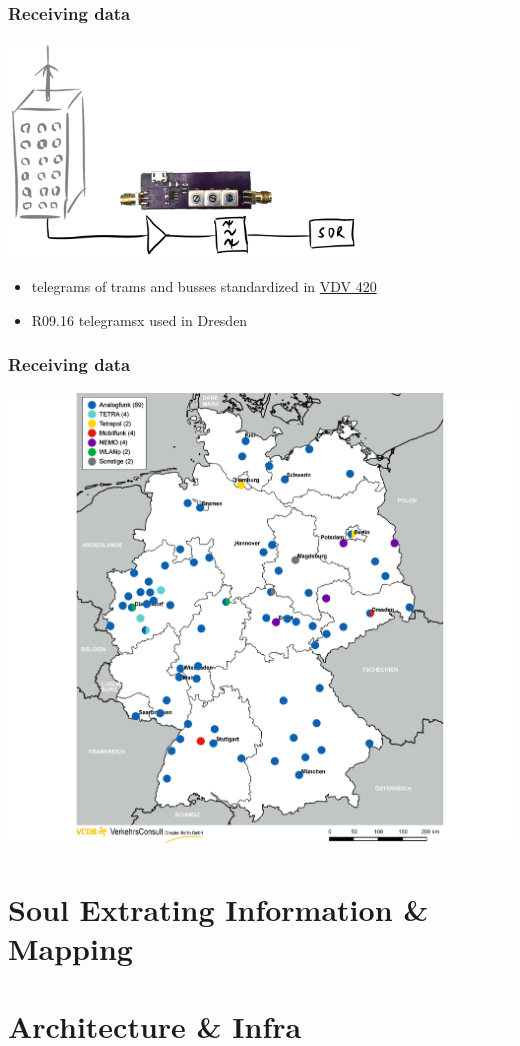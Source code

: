 \documentclass[aspectratio=169]{beamer}
\begin{document}
\begin{frame}
\frametitle{Receiving data}
\centering
\includegraphics[width=0.7\textwidth]{figs/antenna-filter.pdf}
\end{frame}

\begin{frame}
	\begin{itemize}
	\item telegrams of trams and busses standardized in \href{https://knowhow.vdv.de/documents/420/}{VDV 420}
	\item R09.16 telegramsx used in Dresden
	\end{itemize}
\end{frame}

\begin{frame}
\frametitle{Receiving data}
\centering

\includegraphics[height=0.8\textheight]{figs/vcdb-map-ampelbeeinflussung.png}
\end{frame}

\section{Soul Extrating Information \& Mapping }


\section{Architecture \& Infra }
\end{document}
